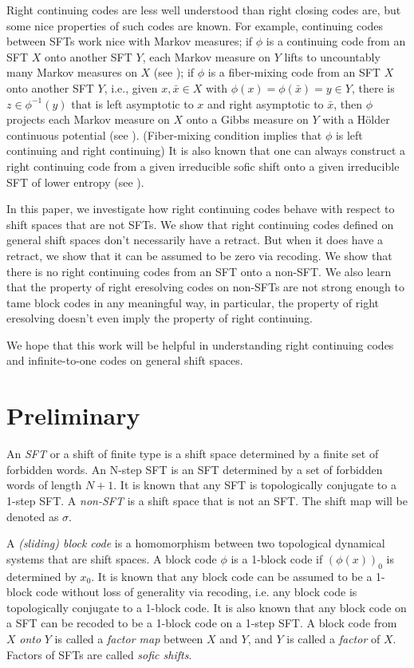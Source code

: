 \documentclass[a4paper]{amsart}
\theoremstyle{definition}
\numberwithin{equation}{section}
\numberwithin{figure}{section}
\theoremstyle{definition}
\theoremstyle{remark}
\begin{document}
Right continuing codes are less well understood than right closing codes are, but some nice properties of such codes are known. For example, continuing codes between SFTs work nice with Markov measures;
if $\phi$ is a continuing code from an SFT $X$ onto another SFT $Y$, each Markov measure on $Y$ lifts to uncountably many Markov measures on $X$ (see \cite{BT-ITO}); 
if $\phi$ is a fiber-mixing code from an SFT $X$ onto another SFT $Y$, i.e., given $x, \bar{x} \in X$ with $\phi (x) = \phi (\bar{x}) = y \in Y$, there is $z \in \phi^{-1} (y)$ that is left asymptotic to $x$ and right asymptotic to $\bar{x}$, then $\phi$ projects each Markov measure on $X$ onto a Gibbs measure on $Y$ with a H\"older continuous potential (see \cite{CU-ProjectionGibbsian, yoogibbs}). (Fiber-mixing condition implies that $\phi$ is left continuing and right continuing)
It is also known that one can always construct a right continuing code from a given irreducible sofic shift onto a given irreducible SFT of lower entropy (see \cite{J-ExistenceBiContinuing}).

In this paper, we investigate how right continuing codes behave with respect to shift spaces that are not SFTs. We show that right continuing codes defined on general shift spaces don't necessarily have a retract. But when it does have a retract, we show that it can be assumed to be zero via recoding.
We show that there is no right continuing codes from an SFT onto a non-SFT.
We also learn that the property of right eresolving codes on non-SFTs are not strong enough to tame block codes in any meaningful way, in particular, the property of  right eresolving doesn't even imply the property of right continuing.

We hope that this work will be helpful in understanding right continuing codes and infinite-to-one codes on general shift spaces.

\section{Preliminary}

An \emph{SFT} or a shift of finite type is a shift space determined by a finite set of forbidden words. An N-step SFT is an SFT determined by a set of forbidden words of length $N+1$. It is known that any SFT is topologically conjugate to a 1-step SFT.  A \emph{non-SFT} is a shift space that is not an SFT. The shift map will be denoted as $\sigma$.

A \emph{(sliding) block code} is a homomorphism between two topological dynamical systems that are shift spaces. A block code $\phi$ is a 1-block code if $(\phi(x))_0$  is determined by $x_0$. It is known that any block code can be assumed to be a 1-block code without loss of generality via recoding, i.e. any block code is topologically conjugate to a 1-block code. It is also known that any block code on a SFT can be recoded to be a 1-block code on a 1-step SFT. A block code from $X$ \emph{onto} $Y$ is called a \emph{factor map} between $X$ and $Y$, and $Y$ is called a \emph{factor} of $X$. Factors of SFTs are called \emph{sofic shifts}.
\end{document}
